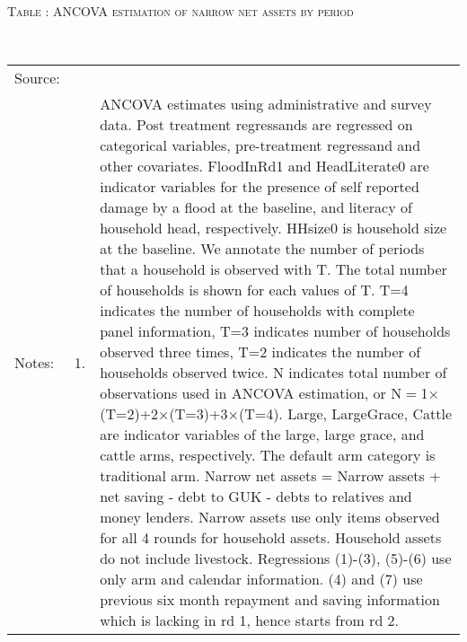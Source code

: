 

\hspace{-1cm}\begin{minipage}[t]{14cm} \hfil\textsc{\normalsize Table \thetable: ANCOVA estimation of narrow net assets by period\label{tab ANCOVA narrow net assets timevarying}}\\ \setlength{\tabcolsep}{1pt}
  \setlength{\baselineskip}{8pt}
  \renewcommand{\arraystretch}{.55}
  \hfil{}\\
\renewcommand{\arraystretch}{.8}
\setlength{\tabcolsep}{1pt} \begin{tabular}{>{\hfill\scriptsize}p{1cm}<{}>{\hfill\scriptsize}p{.25cm}<{}>{\scriptsize}p{12cm}<{\hfill}} 
Source:& \multicolumn{2}{l}{\scriptsize Estimated with GUK administrative and survey data.}\\
Notes: & 1. & ANCOVA estimates using administrative and survey data. Post treatment regressands are regressed on categorical variables, pre-treatment regressand and other covariates. \textsf{FloodInRd1} and \textsf{HeadLiterate0} are indicator variables for the presence of self reported damage by a flood at the baseline, and literacy of household head, respectively. \textsf{HHsize0} is household size at the baseline. We annotate the number of periods that a household is observed with \textsf{T}. The total number of households is shown for each values of \textsf{T}. \textsf{T=4} indicates the number of households with complete panel information, \textsf{T=3} indicates number of households observed three times, \textsf{T=2} indicates the number of households observed twice. \textsf{N} indicates total number of observations used in ANCOVA estimation, or \textsf{N$=$1$\times$(T=2)+2$\times$(T=3)+3$\times$(T=4)}.  \textsf{Large}, \textsf{LargeGrace}, \textsf{Cattle} are indicator variables of the \textsf{large}, \textsf{large grace}, and \textsf{cattle} arms, respectively. The default arm category is \textsf{traditional} arm. Narrow net assets = Narrow assets + net saving - debt to GUK - debts to relatives and money lenders. Narrow assets use only items observed for all 4 rounds for household assets. Household assets do not include livestock. Regressions (1)-(3), (5)-(6) use only arm and calendar information. (4) and (7) use previous six month repayment and saving information which is lacking in rd 1, hence starts from rd 2.\\

\end{tabular}
\end{minipage}
